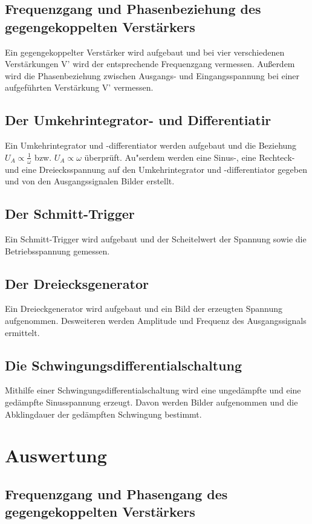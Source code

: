 \documentclass[]{scrartcl}
\let\oldsection\section
\renewcommand\section{\clearpage\oldsection}
\begin{document}
\subsection{Frequenzgang und Phasenbeziehung des gegengekoppelten Verstärkers}
Ein gegengekoppelter Verstärker wird aufgebaut und bei vier verschiedenen Verstärkungen V' wird der entsprechende Frequenzgang vermessen. Außerdem wird die Phasenbeziehung zwischen Ausgangs- und Eingangsspannung bei einer aufgeführten Verstärkung V' vermessen.

\subsection{Der Umkehrintegrator- und Differentiatir}
Ein Umkehrintegrator und -differentiator werden aufgebaut und die Beziehung $U_A\propto\frac{1}{\omega}$ bzw. $U_A\propto\omega$ überprüft. Au"serdem werden eine Sinus-, eine Rechteck- und eine Dreiecksspannung auf den Umkehrintegrator und -differentiator gegeben und von den Ausgangssignalen Bilder erstellt.

\subsection{Der Schmitt-Trigger}
Ein Schmitt-Trigger wird aufgebaut und der Scheitelwert der Spannung sowie die Betriebsspannung gemessen.

\subsection{Der Dreiecksgenerator}
Ein Dreieckgenerator wird aufgebaut und ein Bild der erzeugten Spannung aufgenommen. Desweiteren werden Amplitude und Frequenz des Ausgangssignals ermittelt.

\subsection{Die Schwingungsdifferentialschaltung}
Mithilfe einer Schwingungsdifferentialschaltung wird eine ungedämpfte und eine gedämpfte Sinusspannung erzeugt. Davon werden Bilder aufgenommen und die Abklingdauer der gedämpften Schwingung bestimmt.

\section{Auswertung}

\subsection{Frequenzgang und Phasengang des gegengekoppelten Verstärkers}
\end{document}

